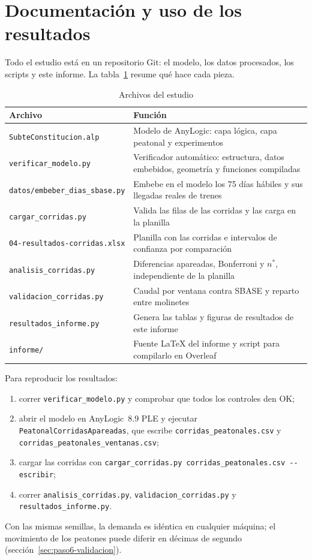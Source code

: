 \section{Documentación y uso de los resultados}
\label{sec:documentacion}

Todo el estudio está en un repositorio Git: el modelo, los datos procesados, los scripts y este informe. La
tabla~\ref{tab:archivos} resume qué hace cada pieza.

\begin{table}[H]
\centering
\caption{Archivos del estudio}
\label{tab:archivos}
\small
\begin{tabularx}{\textwidth}{@{}>{\raggedright\arraybackslash}p{4.6cm} X@{}}
\toprule
Archivo & Función \\
\midrule
\texttt{SubteConstitucion.alp} & Modelo de AnyLogic: capa lógica, capa peatonal y experimentos \\
\texttt{verificar\_modelo.py} & Verificador automático: estructura, datos embebidos, geometría y funciones compiladas \\
\texttt{datos/embeber\_dias\_sbase.py} & Embebe en el modelo los 75 días hábiles y sus llegadas reales de trenes \\
\texttt{cargar\_corridas.py} & Valida las filas de las corridas y las carga en la planilla \\
\texttt{04-resultados-corridas.xlsx} & Planilla con las corridas e intervalos de confianza por comparación \\
\texttt{analisis\_corridas.py} & Diferencias apareadas, Bonferroni y $n^{*}$, independiente de la planilla \\
\texttt{validacion\_corridas.py} & Caudal por ventana contra SBASE y reparto entre molinetes \\
\texttt{resultados\_informe.py} & Genera las tablas y figuras de resultados de este informe \\
\texttt{informe/} & Fuente \LaTeX{} del informe y script para compilarlo en Overleaf \\
\bottomrule
\end{tabularx}
\end{table}

Para reproducir los resultados:
\begin{enumerate}
  \item correr \texttt{verificar\_modelo.py} y comprobar que todos los controles den OK;
  \item abrir el modelo en AnyLogic~8.9 PLE y ejecutar \texttt{PeatonalCorridasApareadas}, que escribe
        \texttt{corridas\_peatonales.csv} y \texttt{corridas\_peatonales\_ventanas.csv};
  \item cargar las corridas con \texttt{cargar\_corridas.py corridas\_peatonales.csv -{}-escribir};
  \item correr \texttt{analisis\_corridas.py}, \texttt{validacion\_corridas.py} y \texttt{resultados\_informe.py}.
\end{enumerate}
Con las mismas semillas, la demanda es idéntica en cualquier máquina; el movimiento de los peatones puede
diferir en décimas de segundo (sección~\ref{sec:paso6-validacion}).

